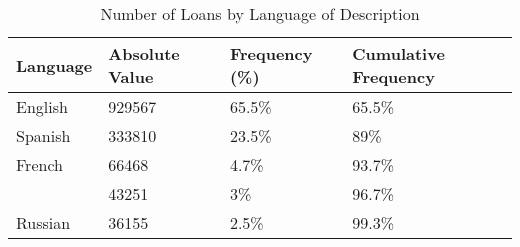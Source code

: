 \begin{table}[!htb]
\centering
\begin{tabular}{llll}
  \hline
Language & Absolute Value & Frequency (\%) & Cumulative Frequency \\ 
  \hline
English & 929567 & 65.5\% & 65.5\% \\ 
  Spanish & 333810 & 23.5\% & 89\% \\ 
  French & 66468 & 4.7\% & 93.7\% \\ 
   & 43251 & 3\% & 96.7\% \\ 
  Russian & 36155 & 2.5\% & 99.3\% \\ 
   \hline
\end{tabular}
\caption{Number of Loans by Language of Description} 
\label{tab:Language}
\end{table}
